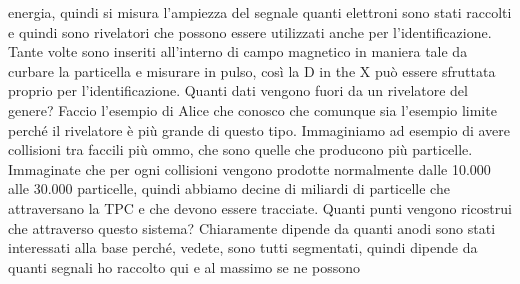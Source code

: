 energia, quindi si misura l'ampiezza del segnale quanti elettroni sono stati raccolti e quindi sono rivelatori che possono essere utilizzati anche per l'identificazione. Tante volte sono inseriti all'interno di campo magnetico in maniera tale da curbare la particella e misurare in pulso, così la D in the X può essere sfruttata proprio per l'identificazione. Quanti dati vengono fuori da un rivelatore del genere? Faccio l'esempio di Alice che conosco che comunque sia l'esempio limite perché il rivelatore è più grande di questo tipo. Immaginiamo ad esempio di avere collisioni tra faccili più ommo, che sono quelle che producono più particelle. Immaginate che per ogni collisioni vengono prodotte normalmente dalle 10.000 alle 30.000 particelle, quindi abbiamo decine di miliardi di particelle che attraversano la TPC e che devono essere tracciate. Quanti punti vengono ricostrui che attraverso questo sistema? Chiaramente dipende da quanti anodi sono stati interessati alla base perché, vedete, sono tutti segmentati, quindi dipende da quanti segnali ho raccolto qui e al massimo se ne possono 

